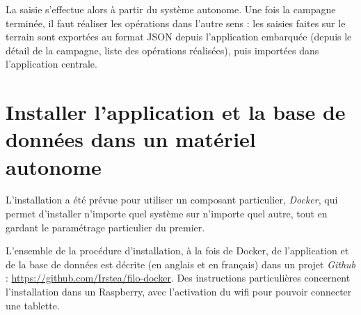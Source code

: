 La saisie s'effectue alors à partir du système autonome. Une fois la campagne terminée, il faut réaliser les opérations dans l'autre sens :  les saisies faites sur le terrain sont exportées au format JSON depuis l'application embarquée (depuis le détail de la campagne, liste des opérations réalisées), puis importées dans l'application centrale.

\section{Installer l'application et la base de données dans un matériel autonome}

L'installation a été prévue pour utiliser un composant particulier, \textit{Docker}, qui permet d'installer n'importe quel système sur n'importe quel autre, tout en gardant le paramétrage particulier du premier.

L'ensemble de la procédure d'installation, à la fois de Docker, de l'application et de la base de données est décrite (en anglais et en français) dans un projet \textit{Github} : \href{https://github.com/Irstea/filo-docker}{https://github.com/Irstea/filo-docker}.
Des instructions particulières concernent l'installation dans un Raspberry, avec l'activation du wifi pour pouvoir connecter une tablette.

